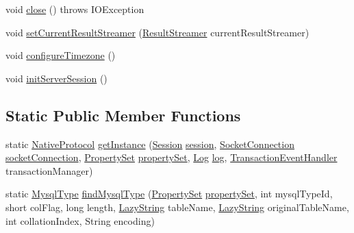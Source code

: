 \begin{DoxyCompactItemize}
\item 
void \mbox{\hyperlink{classcom_1_1mysql_1_1cj_1_1protocol_1_1a_1_1_native_protocol_a74b35f6ae7f3feb2baeee7a845c82085}{close}} ()  throws I\+O\+Exception 
\item 
void \mbox{\hyperlink{classcom_1_1mysql_1_1cj_1_1protocol_1_1a_1_1_native_protocol_a0b65b9cd6aa03061e067e1d595d0ef39}{set\+Current\+Result\+Streamer}} (\mbox{\hyperlink{interfacecom_1_1mysql_1_1cj_1_1protocol_1_1_result_streamer}{Result\+Streamer}} current\+Result\+Streamer)
\item 
void \mbox{\hyperlink{classcom_1_1mysql_1_1cj_1_1protocol_1_1a_1_1_native_protocol_a125fe378f81937bcf676327f270f8025}{configure\+Timezone}} ()
\item 
void \mbox{\hyperlink{classcom_1_1mysql_1_1cj_1_1protocol_1_1a_1_1_native_protocol_a61e852702d328b23aa56145df3608e51}{init\+Server\+Session}} ()
\end{DoxyCompactItemize}
\subsection*{Static Public Member Functions}
\begin{DoxyCompactItemize}
\item 
static \mbox{\hyperlink{classcom_1_1mysql_1_1cj_1_1protocol_1_1a_1_1_native_protocol}{Native\+Protocol}} \mbox{\hyperlink{classcom_1_1mysql_1_1cj_1_1protocol_1_1a_1_1_native_protocol_a7e5653b7c284dc8a41a41a65e1b0cd81}{get\+Instance}} (\mbox{\hyperlink{interfacecom_1_1mysql_1_1cj_1_1_session}{Session}} \mbox{\hyperlink{classcom_1_1mysql_1_1cj_1_1protocol_1_1_abstract_protocol_a6ec300f5f577fdb6d042e361b7b5c0f6}{session}}, \mbox{\hyperlink{interfacecom_1_1mysql_1_1cj_1_1protocol_1_1_socket_connection}{Socket\+Connection}} \mbox{\hyperlink{classcom_1_1mysql_1_1cj_1_1protocol_1_1_abstract_protocol_a0c3af4e90e3533ff217b0c1d1f238f2d}{socket\+Connection}}, \mbox{\hyperlink{interfacecom_1_1mysql_1_1cj_1_1conf_1_1_property_set}{Property\+Set}} \mbox{\hyperlink{classcom_1_1mysql_1_1cj_1_1protocol_1_1_abstract_protocol_a54dc78f51d6cf3388dfbee5b36814382}{property\+Set}}, \mbox{\hyperlink{interfacecom_1_1mysql_1_1cj_1_1log_1_1_log}{Log}} \mbox{\hyperlink{classcom_1_1mysql_1_1cj_1_1protocol_1_1_abstract_protocol_a3c27ad2f43100d6650c4a71b833190cc}{log}}, \mbox{\hyperlink{interfacecom_1_1mysql_1_1cj_1_1_transaction_event_handler}{Transaction\+Event\+Handler}} transaction\+Manager)
\item 
static \mbox{\hyperlink{enumcom_1_1mysql_1_1cj_1_1_mysql_type}{Mysql\+Type}} \mbox{\hyperlink{classcom_1_1mysql_1_1cj_1_1protocol_1_1a_1_1_native_protocol_a2b0c29f057a3332e2c8d070341361f32}{find\+Mysql\+Type}} (\mbox{\hyperlink{interfacecom_1_1mysql_1_1cj_1_1conf_1_1_property_set}{Property\+Set}} \mbox{\hyperlink{classcom_1_1mysql_1_1cj_1_1protocol_1_1_abstract_protocol_a54dc78f51d6cf3388dfbee5b36814382}{property\+Set}}, int mysql\+Type\+Id, short col\+Flag, long length, \mbox{\hyperlink{classcom_1_1mysql_1_1cj_1_1util_1_1_lazy_string}{Lazy\+String}} table\+Name, \mbox{\hyperlink{classcom_1_1mysql_1_1cj_1_1util_1_1_lazy_string}{Lazy\+String}} original\+Table\+Name, int collation\+Index, String encoding)
\end{DoxyCompactItemize}
